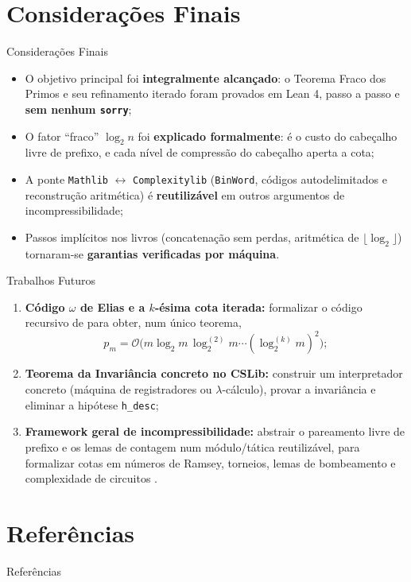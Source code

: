 \documentclass[10pt, aspectratio=43]{beamer}
\begin{document}
\section[Considerações Finais]{Considerações Finais}

\begin{frame}{Considerações Finais}
    \begin{itemize}
        \item O objetivo principal foi \textbf{integralmente alcançado}: o Teorema Fraco dos Primos e seu refinamento iterado foram provados em Lean 4, passo a passo e \textbf{sem nenhum \texttt{sorry}};
        \medskip
        \item O fator ``fraco'' $\log_2 n$ foi \textbf{explicado formalmente}: é o custo do cabeçalho livre de prefixo, e cada nível de compressão do cabeçalho aperta a cota;
        \medskip
        \item A ponte \texttt{Mathlib} $\leftrightarrow$ \texttt{Complexitylib} (\texttt{BinWord}, códigos autodelimitados e reconstrução aritmética) é \textbf{reutilizável} em outros argumentos de incompressibilidade;
        \medskip
        \item Passos implícitos nos livros (concatenação sem perdas, aritmética de $\lfloor\log_2\rfloor$) tornaram-se \textbf{garantias verificadas por máquina}.
    \end{itemize}
\end{frame}

\begin{frame}{Trabalhos Futuros}
    \begin{enumerate}
        \item \textbf{Código $\omega$ de Elias e a $k$-ésima cota iterada:} formalizar o código recursivo de  para obter, num único teorema,
        \begin{equation*}
            p_m = \mathcal{O}\big(m \log_2 m \, \log_2^{(2)} m \cdots (\log_2^{(k)} m)^2\big);
        \end{equation*}
        \item \textbf{Teorema da Invariância concreto no CSLib:} construir um interpretador concreto (máquina de registradores ou $\lambda$-cálculo), provar a invariância e eliminar a hipótese \texttt{h\_desc};
        \medskip
        \item \textbf{Framework geral de incompressibilidade:} abstrair o pareamento livre de prefixo e os lemas de contagem num módulo/tática reutilizável, para formalizar cotas em números de Ramsey, torneios, lemas de bombeamento e complexidade de circuitos \cite{li2019introduction}.
    \end{enumerate}
\end{frame}

\section{Referências}
\begin{frame}[allowframebreaks]{Referências}
    
\end{frame}
\end{document}
